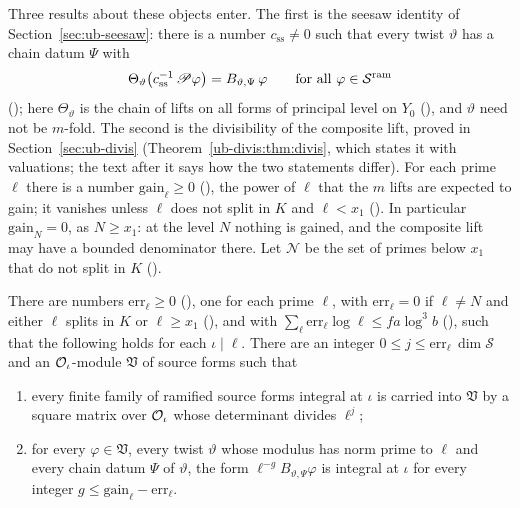 Three results about these objects enter. The first is the seesaw identity of
Section~\ref{sec:ub-seesaw}: there is a number $c_{\mathrm{ss}} \ne 0$ such that every twist
$\vartheta$ has a chain datum $\Psi$ with
\begin{equation}\label{main:eq:seesaw}
  \Theta_\vartheta\bigl( c_{\mathrm{ss}}^{-1}\,\mathscr{P}\varphi \bigr) = B_{\vartheta,\Psi}\,\varphi
  \qquad \text{for all } \varphi \in \mathcal{S}^{\mathrm{ram}}
\end{equation}
(); here $\Theta_\vartheta$ is the chain of lifts on
all forms of principal level on $Y_0$ (), and $\vartheta$ need not be
$m$-fold. The second is the divisibility of the composite
lift, proved in Section~\ref{sec:ub-divis} (Theorem~\ref{ub-divis:thm:divis}, which states it with
valuations; the text after it says how the two statements differ). For each prime $\ell$ there is a number
$\mathrm{gain}_\ell \ge 0$ (), the power of $\ell$ that the $m$ lifts are
expected to gain; it vanishes unless $\ell$ does not split in $K$ and $\ell < x_1$
(). In particular $\mathrm{gain}_N = 0$, as $N \ge x_1$: at the level
$N$ nothing is gained, and the composite lift may have a bounded denominator there.
Let $\mathcal{N}$ be the set of primes below $x_1$ that do not split in $K$
().

\begin{theorem}\label{main:thm:divis}
There are numbers $\mathrm{err}_\ell \ge 0$ (), one for each
prime $\ell$, with $\mathrm{err}_\ell = 0$ if $\ell \ne N$ and either $\ell$ splits in $K$ or
$\ell \ge x_1$ (), and with
$\sum_\ell \mathrm{err}_\ell \log\ell \le f a \log^3 b$
(), such that the following holds for each
$\iota \mid \ell$. There are an integer $0 \le j \le \mathrm{err}_\ell\,\dim\mathcal{S}$ and an
$\mathcal{O}_\iota$-module $\mathfrak V$ of source forms such that
\begin{enumerate}[label=(\roman*)]
\item every finite family of ramified source forms integral at $\iota$ is carried into $\mathfrak V$ by a
  square matrix over $\mathcal{O}_\iota$ whose determinant divides $\ell^j$;
\item for every $\varphi \in\mathfrak V$, every twist $\vartheta$ whose modulus has norm prime to $\ell$
  and every chain datum $\Psi$ of $\vartheta$, the form $\ell^{-g}B_{\vartheta,\Psi}\varphi$ is
  integral at $\iota$ for every integer $g \le \mathrm{gain}_\ell - \mathrm{err}_\ell$.
\end{enumerate}
\end{theorem}

